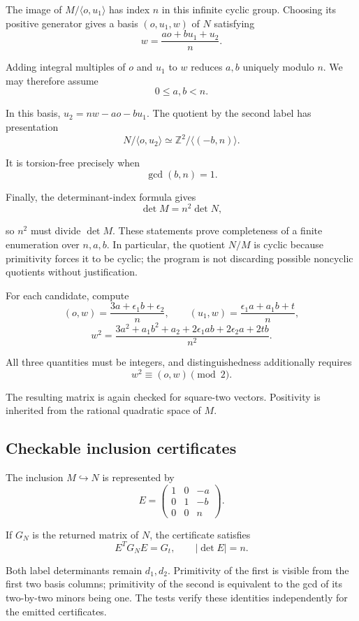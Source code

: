 \documentclass[
  american,
  11pt,
  a4paper,
]{article}
\begin{document}
The image of \(M/\langle o,u_1\rangle\) has index \(n\) in this infinite
cyclic group. Choosing its positive generator gives a basis
\((o,u_1,w)\) of \(N\) satisfying
\[w=\frac{a o+b u_1+u_2}{n}.\]

Adding integral multiples of \(o\) and \(u_1\) to \(w\) reduces \(a,b\)
uniquely modulo \(n\). We may therefore assume
\[0\le a,b<n.\]

In this basis, \(u_2=nw-a o-bu_1\). The quotient by the second label has
presentation
\[N/\langle o,u_2\rangle\simeq\mathbb Z^2/\langle(-b,n)\rangle.\]

It is torsion-free precisely when
\[\gcd(b,n)=1.\]

Finally, the determinant-index formula gives
\[\det M=n^2\det N,\]

so \(n^2\) must divide \(\det M\). These statements prove completeness
of a finite enumeration over \(n,a,b\). In particular, the quotient
\(N/M\) is cyclic because primitivity forces it to be cyclic; the
program is not discarding possible noncyclic quotients without
justification.

For each candidate, compute
\[
(o,w)=\frac{3a+\epsilon_1b+\epsilon_2}{n},\qquad
(u_1,w)=\frac{\epsilon_1a+a_1b+t}{n},
\]
\[
w^2=\frac{3a^2+a_1b^2+a_2+2\epsilon_1ab+2\epsilon_2a+2tb}{n^2}.
\]

All three quantities must be integers, and distinguishedness
additionally requires
\[w^2\equiv(o,w)\pmod2.\]

The resulting matrix is again checked for square-two vectors. Positivity
is inherited from the rational quadratic space of \(M\).

\subsection{Checkable inclusion
certificates}\label{checkable-inclusion-certificates}

The inclusion \(M\hookrightarrow N\) is represented by
\[E=\begin{pmatrix}1&0&-a\\0&1&-b\\0&0&n\end{pmatrix}.\]

If \(G_N\) is the returned matrix of \(N\), the certificate satisfies
\[E^TG_NE=G_t,\qquad |\det E|=n.\]

Both label determinants remain \(d_1,d_2\). Primitivity of the first is
visible from the first two basis columns; primitivity of the second is
equivalent to the gcd of its two-by-two minors being one. The tests
verify these identities independently for the emitted certificates.
\end{document}
